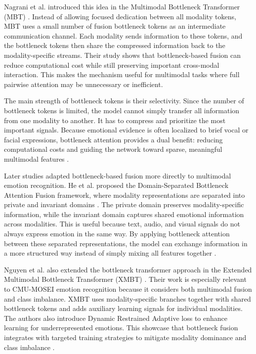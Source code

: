 Nagrani et al. introduced this idea in the Multimodal Bottleneck Transformer (MBT) \cite{nagrani2021attention}. Instead of allowing focused dedication between all modality tokens, MBT uses a small number of fusion bottleneck tokens as an intermediate communication channel. Each modality sends information to these tokens, and the bottleneck tokens then share the compressed information back to the modality-specific streams. Their study shows that bottleneck-based fusion can reduce computational cost while still preserving important cross-modal interaction. This makes the mechanism useful for multimodal tasks where full pairwise attention may be unnecessary or inefficient.

The main strength of bottleneck tokens is their selectivity. Since the number of bottleneck tokens is limited, the model cannot simply transfer all information from one modality to another. It has to compress and prioritize the most important signals. Because emotional evidence is often localized to brief vocal or facial expressions, bottleneck attention provides a dual benefit: reducing computational costs and guiding the network toward sparse, meaningful multimodal features \cite{nagrani2021attention}.

Later studies adapted bottleneck-based fusion more directly to multimodal emotion recognition. He et al. proposed the Domain-Separated Bottleneck Attention Fusion framework, where modality representations are separated into private and invariant domains \cite{he2024domain}. The private domain preserves modality-specific information, while the invariant domain captures shared emotional information across modalities. This is useful because text, audio, and visual signals do not always express emotion in the same way. By applying bottleneck attention between these separated representations, the model can exchange information in a more structured way instead of simply mixing all features together \cite{he2024domain}.

Nguyen et al. also extended the bottleneck transformer approach in the Extended Multimodal Bottleneck Transformer (XMBT) \cite{nguyen2025enhanced}. Their work is especially relevant to CMU-MOSEI emotion recognition because it considers both multimodal fusion and class imbalance. XMBT uses modality-specific branches together with shared bottleneck tokens and adds auxiliary learning signals for individual modalities. The authors also introduce Dynamic Restrained Adaptive loss to enhance learning for underrepresented emotions. This showcase that bottleneck fusion integrates with targeted training strategies to mitigate modality dominance and class imbalance \cite{nguyen2025enhanced}.


